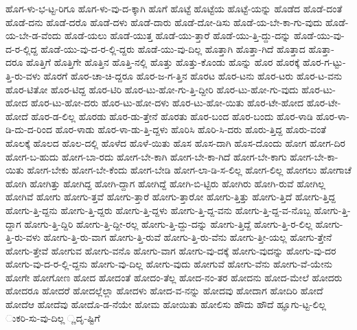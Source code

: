 {ಹೊಗ-ಳು-ಭ-ಟ್ಟ-ರಿಗೂ
ಹೊಗ-ಳು-ವು-ದ-ಕ್ಕಾಗಿ
ಹೊಗೆ
ಹೊಟ್ಟೆ
ಹೊಟ್ಟೆಯ
ಹೊಟ್ಟೆ-ಯನ್ನು
ಹೊಡೆದ
ಹೊಡೆ-ದಂತೆ
ಹೊಡೆ-ದನು
ಹೊಡೆ-ದರೊ
ಹೊಡೆ-ದಳು
ಹೊಡೆ-ದಾರು
ಹೊಡೆ-ದೋ-ಡಿಸು
ಹೊಡೆ-ಯ-ಬೇ-ಕಾ-ಗು-ವುದು
ಹೊಡೆ-ಯ-ಬೇ-ಡ-ವೆಂದು
ಹೊಡೆ-ಯಲು
ಹೊಡೆ-ಯುತ್ತ
ಹೊಡೆ-ಯು-ತ್ತಾರೆ
ಹೊಡೆ-ಯು-ತ್ತಿ-ದ್ದು-ದನ್ನು
ಹೊಡೆ-ಯು-ವು-ದ-ರ-ಲ್ಲಿದ್ದ
ಹೊಡೆ-ಯು-ವು-ದ-ರ-ಲ್ಲಿ-ದ್ದರು
ಹೊಡೆ-ಯು-ವು-ದಿಲ್ಲ
ಹೊತ್ತಾಗಿ
ಹೊತ್ತಾ-ಗಿದೆ
ಹೊತ್ತಾದ
ಹೊತ್ತಾ-ದರೂ
ಹೊತ್ತಿಗೆ
ಹೊತ್ತಿಗೇ
ಹೊತ್ತಿನ
ಹೊತ್ತಿ-ನಲ್ಲಿ
ಹೊತ್ತು
ಹೊತ್ತು-ಕೊಂಡು
ಹೊನ್ನು
ಹೊರ
ಹೊರಕ್ಕೆ
ಹೊರ-ಗ-ಟ್ಟು-ತ್ತಿ-ರು-ವಳು
ಹೊರಗೆ
ಹೊರ-ಚಾ-ಚಿ-ದ್ದರೂ
ಹೊರ-ಜ-ಗ-ತ್ತಿನ
ಹೊರಟ
ಹೊರ-ಟನು
ಹೊರ-ಟರು
ಹೊರ-ಟ-ವನು
ಹೊರ-ಟಿತೋ
ಹೊರ-ಟಿದ್ದ
ಹೊರ-ಟಿರಿ
ಹೊರ-ಟು-ಹೋ-ಗು-ತ್ತಿ-ದ್ದೀರಿ
ಹೊರ-ಟು-ಹೋ-ಗು-ವುದು
ಹೊರ-ಟು-ಹೋದ
ಹೊರ-ಟು-ಹೋ-ದರು
ಹೊರ-ಟು-ಹೋ-ದಳು
ಹೊರ-ಟು-ಹೋ-ಯಿತು
ಹೊರ-ಟೇ-ಹೋದ
ಹೊರ-ಟೇ-ಹೋದೆ
ಹೊರ-ಡ-ಲಿಲ್ಲ
ಹೊರಡು
ಹೊರ-ಡು-ತ್ತೇನೆ
ಹೊರತು
ಹೊರ-ಬಂದ
ಹೊರ-ಬಂದು
ಹೊರ-ಳಾಡಿ
ಹೊರ-ಳಾ-ಡಿ-ದು-ದ-ರಿಂದ
ಹೊರ-ಳಾಡು
ಹೊರ-ಳಾ-ಡು-ತ್ತಿ-ದ್ದಳು
ಹೊರಿಸಿ
ಹೊರಿ-ಸಿ-ದರು
ಹೊರು-ತ್ತಿದ್ದ
ಹೊರು-ವಂತೆ
ಹೊಲಕ್ಕೆ
ಹೊಲದ
ಹೊಲ-ದಲ್ಲಿ
ಹೊಳೆದ
ಹೊಳೆ-ಯಿತು
ಹೊಸ
ಹೊಸ-ದಾಗಿ
ಹೊಸ-ದೊಂದು
ಹೋಗ
ಹೋಗ-ದಿರ
ಹೋಗ-ಬ-ಹುದು
ಹೋಗ-ಬಾ-ರದು
ಹೋಗ-ಬೇ-ಕಾಗಿ
ಹೋಗ-ಬೇ-ಕಾ-ಗಿದೆ
ಹೋಗ-ಬೇ-ಕಾಗು
ಹೋಗ-ಬೇ-ಕಾ-ಯಿತು
ಹೋಗ-ಬೇಕು
ಹೋಗ-ಬೇ-ಕೆಂದು
ಹೋಗ-ಬೇಡಿ
ಹೋಗ-ಲಾ-ಡಿ-ಸ-ಲಿಲ್ಲ
ಹೋಗ-ಲಿಲ್ಲ
ಹೋಗಲು
ಹೋಗಾಚೆ
ಹೋಗಿ
ಹೋಗಿತ್ತು
ಹೋಗಿದ್ದ
ಹೋಗಿ-ದ್ದಾಗ
ಹೋಗಿದ್ದೆ
ಹೋಗಿ-ಬಿ-ಟ್ಟಿರು
ಹೋಗಿರು
ಹೋಗಿ-ರುವೆ
ಹೋಗಿಲ್ಲ
ಹೋಗಿವೆ
ಹೋಗು
ಹೋಗು-ತ್ತವೆ
ಹೋಗು-ತ್ತಾರೆ
ಹೋಗು-ತ್ತಾರೋ
ಹೋಗು-ತ್ತಿತ್ತು
ಹೋಗು-ತ್ತಿದೆ
ಹೋಗು-ತ್ತಿದ್ದ
ಹೋಗು-ತ್ತಿ-ದ್ದನು
ಹೋಗು-ತ್ತಿ-ದ್ದರು
ಹೋಗು-ತ್ತಿ-ದ್ದಳು
ಹೋಗು-ತ್ತಿ-ದ್ದ-ವನು
ಹೋಗು-ತ್ತಿ-ದ್ದ-ವ-ನೊಬ್ಬ
ಹೋಗು-ತ್ತಿ-ದ್ದಾಗ
ಹೋಗು-ತ್ತಿ-ದ್ದಿರಿ
ಹೋಗು-ತ್ತಿ-ದ್ದೀ-ರಲ್ಲ
ಹೋಗು-ತ್ತಿ-ದ್ದು-ದನ್ನು
ಹೋಗು-ತ್ತಿದ್ದೆ
ಹೋಗು-ತ್ತಿ-ರ-ಲಿಲ್ಲ
ಹೋಗು-ತ್ತಿ-ರು-ವಳು
ಹೋಗು-ತ್ತಿ-ರು-ವಾಗ
ಹೋಗು-ತ್ತಿ-ರುವೆ
ಹೋಗು-ತ್ತಿ-ರು-ವೆನು
ಹೋಗು-ತ್ತೀ-ಯಲ್ಲ
ಹೋಗು-ತ್ತೇನೆ
ಹೋಗು-ತ್ತೇವೆ
ಹೋಗುವ
ಹೋಗು-ವನೊ
ಹೋಗು-ವಾಗ
ಹೋಗು-ವು-ದಕ್ಕೆ
ಹೋಗು-ವುದನ್ನು
ಹೋಗು-ವು-ದರ
ಹೋಗು-ವು-ದ-ರ-ಲ್ಲಿ-ದ್ದನು
ಹೋಗು-ವು-ದಿಲ್ಲ
ಹೋಗು-ವುದು
ಹೋಗುವೆ
ಹೋಗು-ವೆನು
ಹೋಗು-ವೆ-ಯೇನು
ಹೋಗೇ
ಹೋಗೋಣ
ಹೋದ
ಹೋದಂತೆ
ಹೋದಂ-ತೆಲ್ಲ
ಹೋದ-ನಂ-ತರ
ಹೋದನು
ಹೋದ-ಮೇಲೆ
ಹೋದರು
ಹೋದರೂ
ಹೋದರೆ
ಹೋದಲ್ಲೆಲ್ಲಾ
ಹೋದಳು
ಹೋದ-ವ-ನನ್ನು
ಹೋದವು
ಹೋದಾಗ
ಹೋದಿರಿ
ಹೋದೆ
ಹೋದೆಆ
ಹೋದೆವು
ಹೋದೊ-ಡ-ನೆಯೇ
ಹೋಮ
ಹೋಯಿತು
ಹೋಲಿಸು
ಹೌದು
ಹೌದೆ
ಹ್ಞೂಗು-ಟ್ಟ-ಲಿಲ್ಲ
ುಕರಿ-ಸು-ವು-ದಿಲ್ಲ
್ಣದೃ-ಷ್ಟಿಗೆ
}
